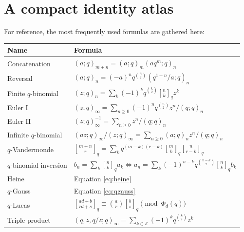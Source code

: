 \documentclass[11pt]{article}
\numberwithin{equation}{section}
\theoremstyle{definition}
\newcommand{\qbinom}[2]{\genfrac{[}{]}{0pt}{}{#1}{#2}_{q}}
\newcommand{\Z}{\mathbb Z}
\begin{document}
\section{A compact identity atlas}
For reference, the most frequently used formulas are gathered here:
\begin{longtable}{>{\raggedright\arraybackslash}p{}p{}}
\toprule
Name & Formula\\
\midrule
Concatenation & $(a;q)_{m+n}=(a;q)_m(aq^m;q)_n$\\[1mm]
Reversal & $(a;q)_n=(-a)^nq^{\binom n2}(q^{1-n}/a;q)_n$\\[1mm]
Finite $q$-binomial & $(z;q)_n=\sum_k(-1)^kq^{\binom k2}\qbinom nkz^k$\\[1mm]
Euler I & $(z;q)_\infty=\sum_{n\ge0}(-1)^nq^{\binom n2}z^n/(q;q)_n$\\[1mm]
Euler II & $(z;q)_\infty^{-1}=\sum_{n\ge0}z^n/(q;q)_n$\\[1mm]
Infinite $q$-binomial & $(az;q)_\infty/(z;q)_\infty=\sum_{n\ge0}(a;q)_nz^n/(q;q)_n$\\[1mm]
$q$-Vandermonde & $\genfrac{[}{]}{0pt}{}{m+n}{r}_q=\sum_kq^{(m-k)(r-k)}\genfrac{[}{]}{0pt}{}{m}{k}_q\genfrac{[}{]}{0pt}{}{n}{r-k}_q$\\[1mm]
$q$-binomial inversion & $b_n=\sum_k\qbinom nka_k\iff a_n=\sum_k(-1)^{n-k}q^{\binom{n-k}2}\qbinom nkb_k$\\[1mm]
Heine & Equation \eqref{eq:heine}\\[1mm]
$q$-Gauss & Equation \eqref{eq:qgauss}\\[1mm]
$q$-Lucas & $\genfrac{[}{]}{0pt}{}{ad+b}{rd+s}_q\equiv\binom ar\genfrac{[}{]}{0pt}{}{b}{s}_q\pmod{\Phi_d(q)}$\\[1mm]
Triple product & $(q,z,q/z;q)_\infty=\sum_{k\in\Z}(-1)^kq^{\binom k2}z^k$\\
\bottomrule
\end{longtable}
\end{document}
